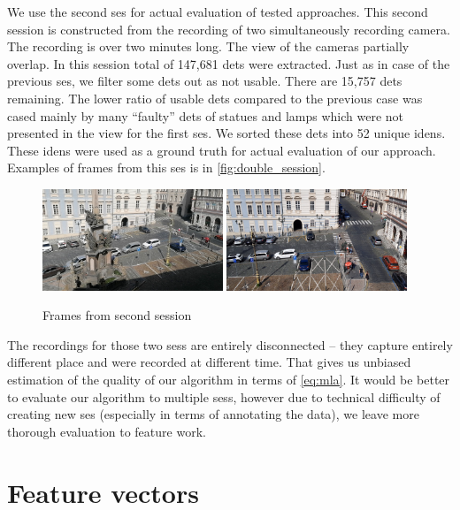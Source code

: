 We use the second \gls{ses} for actual evaluation of tested approaches. This second session is constructed from the recording of two simultaneously recording camera. The recording is over two minutes long. The view of the cameras partially overlap. In this session total of 147,681 \glspl{det} were extracted. Just as in case of the previous \gls{ses}, we filter some \glspl{det} out as not usable. There are 15,757 \glspl{det} remaining. The lower ratio of usable \glspl{det} compared to the previous case was cased mainly by many ``faulty'' \glspl{det} of statues and lamps which were not presented in the view for the first \gls{ses}. We sorted these \glspl{det} into 52 unique \glspl{iden}. These \glspl{iden} were used as a ground truth for actual evaluation of our approach. Examples of frames from this \gls{ses} is in \autoref{fig:double_session}.

\begin{figure}
    \centering
    \includegraphics[width=0.48\textwidth]{img/frame_double_session_1_smaller.png}
    \includegraphics[width=0.48\textwidth]{img/frame_double_session_2_smaller.png}
    \caption{Frames from second session}
    \label{fig:double_session}
\end{figure}

The recordings for those two \glspl{ses} are entirely disconnected -- they
capture entirely different place and were recorded at different time. That gives
us unbiased estimation of the quality of our algorithm in terms of
\autoref{eq:mla}. It would be better to evaluate our algorithm to multiple
\glspl{ses}, however due to technical difficulty of creating new \gls{ses}
(especially in terms of annotating the data), we leave more thorough evaluation
to feature work.

\section{Feature vectors}

